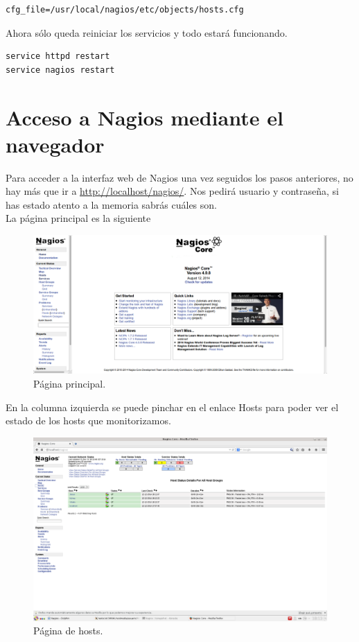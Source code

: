 \documentclass[11pt,a4paper]{article}
\begin{document}
\begin{verbatim}
cfg_file=/usr/local/nagios/etc/objects/hosts.cfg
\end{verbatim}

Ahora sólo queda reiniciar los servicios y todo estará funcionando.

\begin{verbatim}
service httpd restart
service nagios restart
\end{verbatim}

\newpage
\section{Acceso a Nagios mediante el navegador}

Para acceder a la interfaz web de Nagios una vez seguidos los pasos anteriores, no hay más que ir a \url{http://localhost/nagios/}. Nos pedirá usuario y contraseña, si has estado atento a la memoria sabrás cuáles son.\\

La página principal es la siguiente

\begin{figure}[H]
  \centering
\includegraphics[width=12cm]{images/0.png} 
  \caption{Página principal.}
\end{figure}

En la columna izquierda se puede pinchar en el enlace Hosts para poder ver el estado de los hosts que monitorizamos.\\

\begin{figure}[H]
  \centering
\includegraphics[width=12cm]{images/2.png} 
  \caption{Página de hosts.}
\end{figure}
\end{document}
